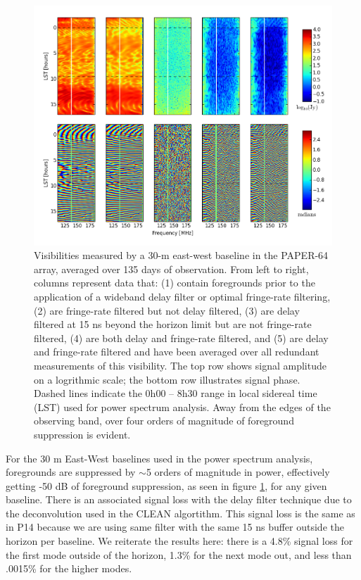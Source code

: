 \documentclass[twocolumn,numberedappendix]{emulateapj} \shorttitle{PSA64}
\begin{document}
\begin{figure}[!t]
\centering
\includegraphics[width=2\columnwidth]{plots/waterfalls.png}
\caption{
Visibilities measured by a 30-m east-west baseline in the PAPER-64 array, 
averaged over 135 days of observation.  From left to right, columns represent
data that: (1) contain foregrounds prior to the application of a wideband
delay filter or optimal fringe-rate filtering, (2) are fringe-rate filtered but
not delay filtered, (3) are delay filtered at 15 ns beyond the horizon limit but
are not fringe-rate filtered, (4) are both delay and fringe-rate filtered,
and (5) are delay and fringe-rate filtered and have been averaged over all
redundant measurements of this visibility.  The top row shows signal amplitude
on a logrithmic scale; the bottom row illustrates signal phase.
Dashed lines indicate the 0h00 -- 8h30 range in local sidereal time (LST) used for power
spectrum analysis.  Away from the edges of the observing band, over four orders 
of magnitude of foreground suppression is evident.
} \label{fig:waterfalls}
\end{figure}

For the 30 m East-West baselines used in the power spectrum analysis,
foregrounds are suppressed by $\sim$5 orders of magnitude in power, effectively
getting -50 dB of foreground suppression, as seen in figure
\ref{fig:waterfalls}, for any given baseline. There is an associated signal loss
with the delay filter technique due to the deconvolution used in the CLEAN
algortithm. This signal loss is the same as in P14 because
we are using same filter with the same 15 ns buffer outside the horizon per
baseline. We reiterate the results here: there is a 4.8\% signal loss for the
first mode outside of the horizon, 1.3\% for the next mode out, and less than
.0015\% for the higher modes.
\end{document}
